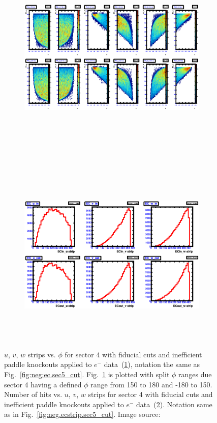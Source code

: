\begin{figure}[!ht]
  \centering
  \begin{subfigure}[b]{\figwidth}
  \includegraphics[width=\figwidth, height=3.5in,valign=c]{figures/calib/ec/pim_ecuvw_phi_afterGeoFid_sec4.eps}\caption{}\label{fig:EC_III_IV}
  \end{subfigure}%
  \\
  \begin{subfigure}[b]{\figwidth}
  \includegraphics[width=\figwidth, height=3.5in,valign=c]{figures/calib/ec/pim_ecuvw_afterGeoFid_sec4.eps}\caption{}\label{fig:EC_IV_IV}
  \end{subfigure}%
      \caption { $u$, $v$, $w$ strips vs. $\phi$ for sector 4 with fiducial cuts and inefficient paddle knockouts applied to $e^-$ data~(\ref{fig:EC_III_IV}), notation the same as Fig.~\ref{fig:neg:ec.sec5_cut}. Fig.~\ref{fig:EC_III_IV} is plotted with split $\phi$ ranges due sector 4 having a defined $\phi$ range from 150 to 180 and -180 to 150. Number of hits vs.  $u$, $v$, $w$ strips for sector 4 with fiducial cuts and inefficient paddle knockouts applied to $e^-$ data~(\ref{fig:EC_IV_IV}). Notation same as in Fig.~\ref{fig:neg.ecstrip.sec5_cut}. Image source:~\cite{clas.thesis.kunkel}}
        \label{fig:EC_cut_IV}
\end{figure}


